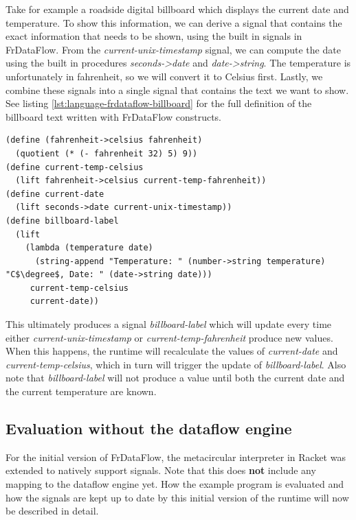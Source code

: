 Take for example a roadside digital billboard which displays the current date and temperature. To show this information, we can derive a signal that contains the exact information that needs to be shown, using the built in signals in FrDataFlow. 
From the \textit{current-unix-timestamp} signal, we can compute the date using the built in procedures \textit{seconds->date} and \textit{date->string}. The temperature is unfortunately in fahrenheit, so we will convert it to Celsius first. Lastly, we combine these signals into a single signal that contains the text we want to show. See listing \ref{lst:language-frdataflow-billboard} for the full definition of the billboard text written with FrDataFlow constructs. 

\begin{lstlisting}[caption={Billboard},captionpos=b,label={lst:language-frdataflow-billboard},mathescape,language=FrDataFlow]
(define (fahrenheit->celsius fahrenheit)
  (quotient (* (- fahrenheit 32) 5) 9))
(define current-temp-celsius
  (lift fahrenheit->celsius current-temp-fahrenheit))
(define current-date
  (lift seconds->date current-unix-timestamp))
(define billboard-label
  (lift
    (lambda (temperature date)
      (string-append "Temperature: " (number->string temperature) "C$\degree$, Date: " (date->string date)))
     current-temp-celsius
     current-date))   
\end{lstlisting}
This ultimately produces a signal \textit{billboard-label} which will update every time either \textit{current-unix-timestamp} or \textit{current-temp-fahrenheit} produce new values. When this happens, the runtime will recalculate the values of \textit{current-date} and \textit{current-temp-celsius}, which in turn will trigger the update of \textit{billboard-label}. Also note that \textit{billboard-label} will not produce a value until both the current date and the current temperature are known. 

\subsection{Evaluation without the dataflow engine}

For the initial version of FrDataFlow, the metacircular interpreter in Racket was extended to natively support signals. Note that this does \textbf{not} include any mapping to the dataflow engine yet. 
How the example program is evaluated and how the signals are kept up to date by this initial version of the runtime will now be described in detail. 
 
